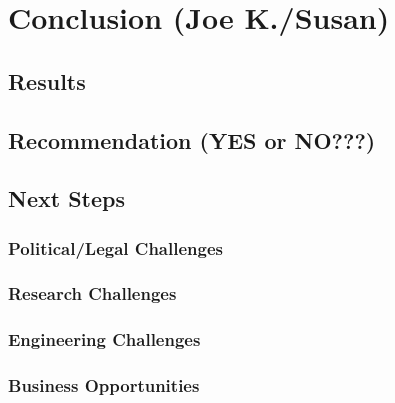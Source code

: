 \chapter{Conclusion (Joe K./Susan)}

\section{Results}
\section{Recommendation (YES or NO???)}
\section{Next Steps}
\subsection{Political/Legal Challenges}
\subsection{Research Challenges}
\subsection{Engineering Challenges}
\subsection{Business Opportunities}
